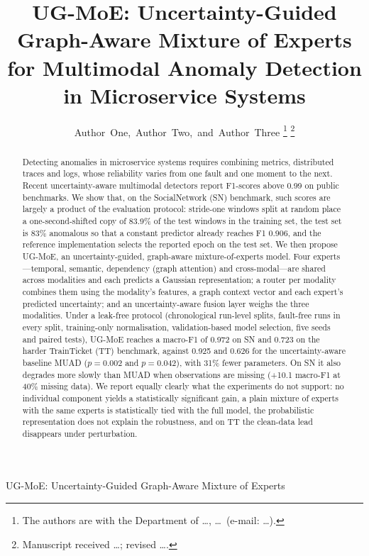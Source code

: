 \documentclass[journal]{IEEEtran}
\newcommand{\ugmoe}{UG-MoE}
\begin{document}
\title{UG-MoE: Uncertainty-Guided Graph-Aware Mixture of Experts for Multimodal Anomaly Detection in Microservice Systems}

\author{Author~One,~Author~Two,~and~Author~Three%
\thanks{The authors are with the Department of \ldots, \ldots\ (e-mail: \ldots).}%
\thanks{Manuscript received \ldots; revised \ldots.}}

%
{UG-MoE: Uncertainty-Guided Graph-Aware Mixture of Experts}

\maketitle

\begin{abstract}
Detecting anomalies in microservice systems requires combining metrics, distributed traces and logs, whose
reliability varies from one fault and one moment to the next. Recent uncertainty-aware multimodal detectors
report F1-scores above 0.99 on public benchmarks. We show that, on the SocialNetwork (SN) benchmark, such
scores are largely a product of the evaluation protocol: stride-one windows split at random place a
one-second-shifted copy of 83.9\% of the test windows in the training set, the test set is 83\% anomalous so
that a constant predictor already reaches F1 0.906, and the reference implementation selects the reported
epoch on the test set. We then propose \ugmoe, an uncertainty-guided, graph-aware mixture-of-experts model.
Four experts---temporal, semantic, dependency (graph attention) and cross-modal---are shared across
modalities and each predicts a Gaussian representation; a router per modality combines them using the
modality's features, a graph context vector and each expert's predicted uncertainty; and an
uncertainty-aware fusion layer weighs the three modalities. Under a leak-free protocol (chronological
run-level splits, fault-free runs in every split, training-only normalisation, validation-based model
selection, five seeds and paired tests), \ugmoe{} reaches a macro-F1 of 0.972 on SN and 0.723 on the harder
TrainTicket (TT) benchmark, against 0.925 and 0.626 for the uncertainty-aware baseline MUAD
($p=0.002$ and $p=0.042$), with 31\% fewer parameters. On SN it also degrades more slowly than MUAD when
observations are missing (+10.1 macro-F1 at 40\% missing data). We report equally clearly what the
experiments do not support: no individual component yields a statistically significant gain, a plain
mixture of experts with the same experts is statistically tied with the full model, the probabilistic
representation does not explain the robustness, and on TT the clean-data lead disappears under
perturbation.
\end{abstract}
\end{document}
